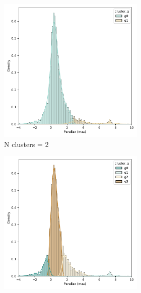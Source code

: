 \documentclass[11pt, a4paper, english]{book}
\begin{document}
\begin{figure}[htbp]
\begin{subfigure}{0.9\textwidth}
\begin{subfigure}[t]{0.3\textwidth}
    \end{subfigure}
  \end{subfigure}
  \medskip
  \begin{subfigure}{0.9\textwidth}
    \centering
    \begin{subfigure}[t]{0.3\textwidth}
      \centering
      \includegraphics[width=\textwidth]{../figures/kmeans_n2_parallax_melotte_22.pdf}
      \caption{N clusters = 2}
    \end{subfigure}
    \hfill
    \begin{subfigure}[t]{0.3\textwidth}
      \centering
      \includegraphics[width=\textwidth]{../figures/kmeans_n5_parallax_melotte_22.pdf}

\end{subfigure}
\end{subfigure}
\end{figure}
\end{document}
